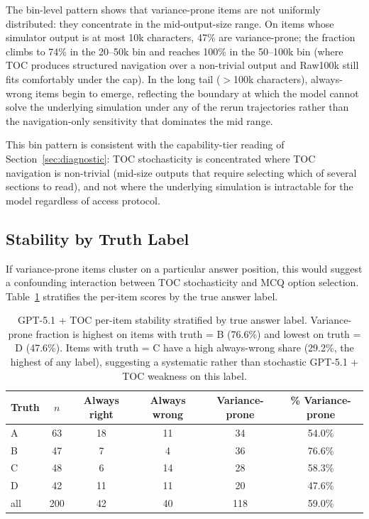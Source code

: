 \documentclass{article}
\begin{document}
The bin-level pattern shows that variance-prone items are not uniformly distributed: they concentrate in the mid-output-size range. On items whose simulator output is at most 10k characters, 47\% are variance-prone; the fraction climbs to 74\% in the 20--50k bin and reaches 100\% in the 50--100k bin (where TOC produces structured navigation over a non-trivial output and Raw100k still fits comfortably under the cap). In the long tail ($>$100k characters), always-wrong items begin to emerge, reflecting the boundary at which the model cannot solve the underlying simulation under any of the rerun trajectories rather than the navigation-only sensitivity that dominates the mid range.

This bin pattern is consistent with the capability-tier reading of Section~\ref{sec:diagnostic}: TOC stochasticity is concentrated where TOC navigation is non-trivial (mid-size outputs that require selecting which of several sections to read), and not where the underlying simulation is intractable for the model regardless of access protocol.

\subsection{Stability by Truth Label}

If variance-prone items cluster on a particular answer position, this would suggest a confounding interaction between TOC stochasticity and MCQ option selection. Table~\ref{tab:appendix-stability-by-label} stratifies the per-item scores by the true answer label.

\begin{table}[h]
\centering
\small
\setlength{\tabcolsep}{8pt}
\begin{tabular}{lccccc}
\toprule
Truth & $n$ & Always right & Always wrong & Variance-prone & \% Variance-prone \\
\midrule
A & 63 & 18 & 11 & 34 & 54.0\% \\
B & 47 & 7 & 4 & 36 & 76.6\% \\
C & 48 & 6 & 14 & 28 & 58.3\% \\
D & 42 & 11 & 11 & 20 & 47.6\% \\
\midrule
all & 200 & 42 & 40 & 118 & 59.0\% \\
\bottomrule
\end{tabular}
\caption{GPT-5.1 + TOC per-item stability stratified by true answer label. Variance-prone fraction is highest on items with truth = B (76.6\%) and lowest on truth = D (47.6\%). Items with truth = C have a high always-wrong share (29.2\%, the highest of any label), suggesting a systematic rather than stochastic GPT-5.1 + TOC weakness on this label.}
\label{tab:appendix-stability-by-label}
\end{table}
\end{document}
